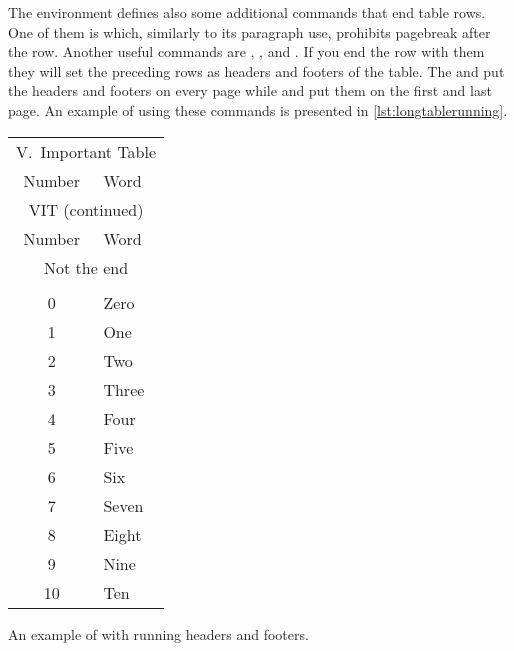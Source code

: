 The  environment defines also some additional commands that end
table rows. One of them is  which, similarly to its
paragraph use, prohibits pagebreak after the row. Another useful commands are
, ,  and . If you end
the row with them they will set the preceding rows as headers and footers of
the table. The  and  put the headers and footers on
every page while  and  put them on the first
and last page. An example of using these commands is presented in
\autoref{lst:longtablerunning}.
\begin{listing}
  \begin{example}[
    standalone,
    to_page=2,
    paperwidth=4.3cm,
    paperheight=5cm,
    examplewidth=8.7cm,
    vertical_mode,
  ]
\usepackage{longtable}
\usepackage{booktabs}

\begin{longtable}{cl}
  \toprule
  \multicolumn{2}{c}{V.~Important Table} \\
  Number & Word                           \\
  \midrule \endfirsthead

  \toprule
  \multicolumn{2}{c}{VIT (continued)}    \\
  Number & Word                          \\
  \midrule \endhead

  \midrule
  \multicolumn{2}{c}{Not the end}        \\
  \bottomrule \endfoot

  \midrule
  \multicolumn{2}{c}{The end of VIT}     \\
  \bottomrule \endlastfoot

  0      & Zero   \\
  1      & One    \\
  2      & Two     \\
  3      & Three \\
  4      & Four  \\
  5      & Five  \\
  6      & Six   \\
  7      & Seven \\
  8      & Eight \\
  9      & Nine  \\
  10     & Ten    \\
\end{longtable}
\end{example}
  \caption{An example of  with running headers and
    footers.}\label{lst:longtablerunning}
\end{listing}

